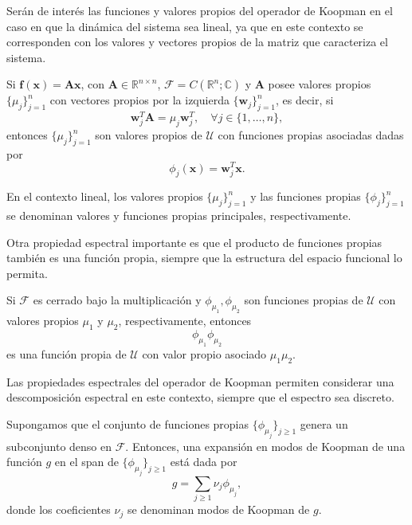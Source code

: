 Serán de interés las funciones y valores propios del operador de Koopman en el caso en que la dinámica del sistema sea lineal, ya que en este contexto se corresponden con los valores y vectores propios de la matriz que caracteriza el sistema.

\begin{prop}
    Si $\mathbf{f}(\mathbf{x}) = \mathbf{A}\mathbf{x}$, con $\mathbf{A} \in \mathbb{R}^{n \times n}$, $\mathcal{F} = C(\mathbb{R}^n; \mathbb{C})$ y $\mathbf{A}$ posee valores propios $\{\mu_j\}_{j=1}^n$ con vectores propios por la izquierda $\{ \mathbf{w}_j \}_{j=1}^n$, es decir, si  
    \begin{equation*}
        \mathbf{w}_j^T \mathbf{A} = \mu_j \mathbf{w}_j^T, \quad \forall j \in \{1, \dots, n\},
    \end{equation*}
    entonces $\{\mu_j\}_{j=1}^n$ son valores propios de $\mathcal{U}$ con funciones propias asociadas dadas por  
    \begin{equation*}
        \phi_j (\mathbf{x}) = \mathbf{w}_j^T \mathbf{x}.
    \end{equation*}
\end{prop}

En el contexto lineal, los valores propios $\{\mu_j\}_{j=1}^n$ y las funciones propias $\{\phi_j\}_{j=1}^n$ se denominan valores y funciones propias principales, respectivamente.  

Otra propiedad espectral importante es que el producto de funciones propias también es una función propia, siempre que la estructura del espacio funcional lo permita.

\begin{prop}
    Si $\mathcal{F}$ es cerrado bajo la multiplicación y $\phi_{\mu_1}, \phi_{\mu_2}$ son funciones propias de $\mathcal{U}$ con valores propios $\mu_1$ y $\mu_2$, respectivamente, entonces  
    \begin{equation*}
        \phi_{\mu_1} \phi_{\mu_2}
    \end{equation*}
    es una función propia de $\mathcal{U}$ con valor propio asociado $\mu_1 \mu_2$.
\end{prop}

Las propiedades espectrales del operador de Koopman permiten considerar una descomposición espectral en este contexto, siempre que el espectro sea discreto.

\begin{defn}
    Supongamos que el conjunto de funciones propias $\{ \phi_{\mu_j} \}_{j \geq 1}$ genera un subconjunto denso en $\mathcal{F}$. Entonces, una expansión en modos de Koopman de una función $g$ en el span de $\{ \phi_{\mu_j} \}_{j \geq 1}$ está dada por  
    \begin{equation*}
        g = \sum_{j \geq 1} \nu_j \phi_{\mu_j},
    \end{equation*}
    donde los coeficientes $\nu_j$ se denominan modos de Koopman de $g$.
\end{defn}

